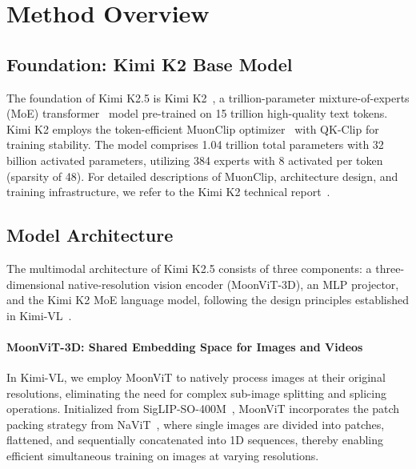 
\section{Method Overview}

\subsection{Foundation: Kimi K2 Base Model}

The foundation of Kimi K2.5 is Kimi K2~\citep{team2025kimik2}, a trillion-parameter mixture-of-experts (MoE) transformer~\citep{transformer} model pre-trained on 15 trillion high-quality text tokens. Kimi K2 employs the token-efficient MuonClip optimizer~\citep{jordan2024muon,liu2025muon} with QK-Clip for training stability. The model comprises 1.04 trillion total parameters with 32 billion activated parameters, utilizing 384 experts with 8 activated per token (sparsity of 48). For detailed descriptions of MuonClip, architecture design, and training infrastructure, we refer to the Kimi K2 technical report~\citep{team2025kimik2}.

\subsection{Model Architecture}



The multimodal architecture of Kimi K2.5 consists of three components: a three-dimensional native-resolution vision encoder (MoonViT-3D), an MLP projector, and the Kimi K2 MoE language model, following the design principles established in Kimi-VL~\citep{team2025kimivl}.

\paragraph{MoonViT-3D: Shared Embedding Space for Images and Videos}

In Kimi-VL, we employ MoonViT to natively process images at their original resolutions, eliminating the need for complex sub-image splitting and splicing operations. Initialized from SigLIP-SO-400M~\citep{zhai2023sigmoidlosslanguageimage}, MoonViT incorporates the patch packing strategy from NaViT~\citep{dehghani2023patchnpacknavit}, where single images are divided into patches, flattened, and sequentially concatenated into 1D sequences, thereby enabling efficient simultaneous training on images at varying resolutions.

